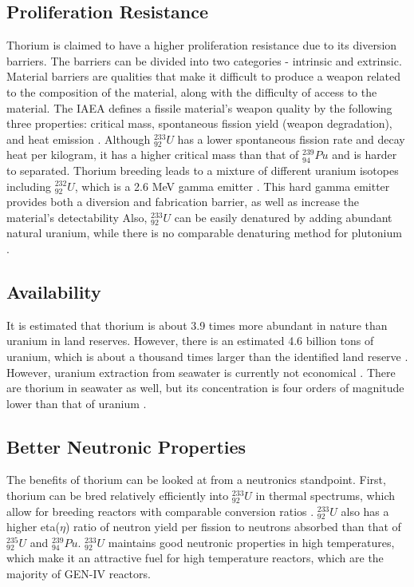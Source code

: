 \documentclass{article}
\newcommand{\uthree}{\xspace $^{233}_{92}U$ \xspace}
\newcommand{\ufive}{\xspace $^{235}_{92}U$\xspace}%
\newcommand{\utwo}{\xspace $^{232}_{92}U$\xspace}
\newcommand{\pu}{\xspace$^{239}_{94}Pu$\xspace}
\begin{document}
\subsection{Proliferation Resistance}
Thorium is claimed to have a higher proliferation resistance
due to its diversion barriers. The barriers can be divided into
two categories - intrinsic and extrinsic. Material barriers
are qualities that make it difficult to produce a weapon related
to the composition of the material, along with the difficulty of
access to the material. The IAEA defines a fissile material's weapon
quality by the following three properties: critical mass, spontaneous 
fission yield (weapon degradation), and heat emission \cite{iaea_thorium_2005}.
Although \uthree has a lower spontaneous fission rate and decay heat per kilogram,
it has a higher critical mass than that of \pu and is harder to separated.
Thorium breeding leads to a mixture of different uranium isotopes including
\utwo, which is a 2.6 MeV gamma emitter \cite{moir_recommendations_2008}. This hard gamma emitter provides
both a diversion and fabrication barrier, as well as increase the material's detectability
Also, \uthree can be easily denatured by adding abundant natural uranium, while
there is no comparable denaturing method for plutonium \cite{kang_u-232_2001}.


\subsection{Availability}
It is estimated that thorium is about 3.9 times more abundant in
nature than uranium \cite{herring_uranium_2013} in land reserves. However, there
is an estimated 4.6 billion tons of uranium, which is about a thousand
times larger than the identified land reserve \cite{agency_uranium_2010}.
However, uranium extraction from seawater is currently not economical \cite{tamada_cost_2006}.
There are thorium in seawater as well, but its concentration is four orders of magnitude
lower than that of uranium \cite{bardi_extracting_2010}. 

\subsection{Better Neutronic Properties}
The benefits of thorium can be looked at from a neutronics standpoint.
First, thorium can be bred relatively efficiently into \uthree in thermal spectrums,
which allow for breeding reactors with comparable conversion ratios \cite{allibert_introduction_2015}.
\uthree also has a higher eta($\eta$) ratio of neutron yield per fission to 
neutrons absorbed than that of \ufive and \pu \cite{lung_perspectives_1998}.
\uthree maintains good neutronic properties in high temperatures,
which make it an attractive fuel for high temperature reactors, which
are the majority of GEN-IV reactors.
\end{document}
